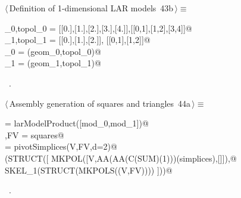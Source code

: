 \documentclass[11pt,oneside]{article}	%
\begin{document}
\begin{flushleft} \small \label{scrap94}
\protect{}$\langle\,$Definition of 1-dimensional LAR models\nobreak\ {\footnotesize 43b}$\,\rangle\equiv$
\vspace{-1ex}
\begin{list}{}{} \item
\mbox{}\verb@geom_0,topol_0 = [[0.],[1.],[2.],[3.],[4.]],[[0,1],[1,2],[3,4]]@\\
\mbox{}\verb@geom_1,topol_1 = [[0.],[1.],[2.]], [[0,1],[1,2]]@\\
\mbox{}\verb@mod_0 = (geom_0,topol_0)@\\
\mbox{}\verb@mod_1 = (geom_1,topol_1)@\\
\mbox{}\verb@@{\NWsep}
\end{list}
\vspace{-1ex}
\footnotesize\addtolength{\baselineskip}{-1ex}
\begin{list}{}{\setlength{\itemsep}{-\parsep}\setlength{\itemindent}{-\leftmargin}}
\item \NWtxtMacroRefIn\ .
\end{list}
\end{flushleft}

\begin{flushleft} \small \label{scrap95}
\protect{}$\langle\,$Assembly generation of squares and triangles\nobreak\ {\footnotesize 44a}$\,\rangle\equiv$
\vspace{-1ex}
\begin{list}{}{} \item
\mbox{}\verb@squares = larModelProduct([mod_0,mod_1])@\\
\mbox{}\verb@V,FV = squares@\\
\mbox{}\verb@simplices = pivotSimplices(V,FV,d=2)@\\
\mbox{}\verb@VIEW(STRUCT([ MKPOL([V,AA(AA(C(SUM)(1)))(simplices),[]]),@\\
\mbox{}\verb@              SKEL_1(STRUCT(MKPOLS((V,FV)))) ]))@\\
\mbox{}\verb@@{\NWsep}
\end{list}
\vspace{-1ex}
\footnotesize\addtolength{\baselineskip}{-1ex}
\begin{list}{}{\setlength{\itemsep}{-\parsep}\setlength{\itemindent}{-\leftmargin}}
\item \NWtxtMacroRefIn\ .
\end{list}
\end{flushleft}
\end{document}
